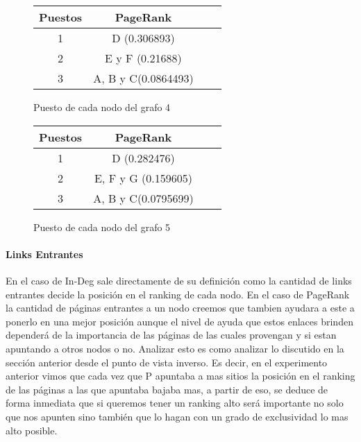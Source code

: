 \begin{figure}[H]
\centering
\begin{minipage}{0.48\textwidth}
\centering

\begin{tabular}{| c | c | c | c |}
  \hline
  Puestos & PageRank\\ \hline \hline
  1 & D (0.306893)\\ \hline
  2 & E y F (0.21688)\\ \hline
  3 & A, B y C(0.0864493)\\ \hline
\end{tabular}
  \caption{\footnotesize{Puesto de cada nodo del grafo 4}}
  \label{fig:Rankings}

\end{minipage}
\hspace{0.02\textwidth}
\begin{minipage}{0.48\textwidth}
  \centering

\begin{tabular}{| c | c | c | c |}
  \hline
  Puestos & PageRank\\ \hline \hline
  1 & D (0.282476)\\ \hline
  2 & E, F y G (0.159605)\\ \hline
  3 & A, B y C(0.0795699)\\ \hline
\end{tabular}
  \caption{\footnotesize{Puesto de cada nodo del grafo 5}}
  \label{fig:Rankings}

\end{minipage}
\end{figure}


\paragraph{Links Entrantes}

En el caso de In-Deg sale directamente de su definición como la cantidad de links entrantes decide la posición en el ranking de cada nodo. En el caso de PageRank la cantidad de páginas entrantes a un nodo creemos que tambien ayudara a este a ponerlo en una mejor posición aunque el nivel de ayuda que estos enlaces brinden dependerá de la importancia de las páginas de las cuales provengan y si estan apuntando a otros nodos o no. Analizar esto es como analizar lo discutido en la sección anterior desde el punto de vista inverso. Es decir, en el experimento anterior vimos que cada vez que P apuntaba a mas sitios la posición en el ranking de las páginas a las que apuntaba bajaba mas, a partir de eso, se deduce de forma inmediata que si queremos tener un ranking alto será importante no solo que nos apunten sino también que lo hagan con un grado de exclusividad lo mas alto posible.

